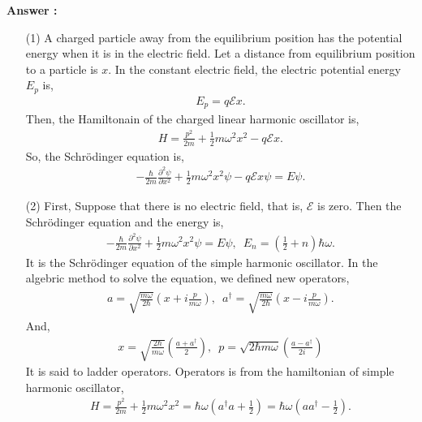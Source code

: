 \documentclass[floatfix,nofootinbib,superscriptaddress,fleqn]{revtex4-2}
\begin{document}
\noindent \textbf{Answer : }
\begin{itemize}
  \item[(1)] A charged particle away from the equilibrium position 
  has the potential energy when it is in the electric field. 
  Let a distance from equilibrium position to a particle is $x$.
  In the constant electric field, the electric potential energy $E_p$ is,
  \begin{align}
    E_p = q\mathcal{E}x.
  \end{align} 
  Then, the Hamiltonain of the charged linear
  harmonic oscillator is,
  \begin{align}\label{eq:1-1}
    H = \frac{p^2}{2m}+\frac{1}{2}m\omega^2x^2-q\mathcal{E}x.
  \end{align}
  So, the Schr\"odinger equation is,
  \begin{align}\label{eq:1-2}
    -\frac{\hbar}{2m}\frac{\partial^2\psi}{\partial x^2}
    +\frac{1}{2}m\omega^2x^2\psi
    -q\mathcal{E}x\psi = E\psi.
  \end{align}
  \item[(2)] First, Suppose that there is no electric field,
  that is, $\mathcal{E}$ is zero. Then the Schr\"odinger equation and 
  the energy is,
  \begin{align}
    -\frac{\hbar}{2m}\frac{\partial^2\psi}{\partial x^2}
    +\frac{1}{2}m\omega^2x^2\psi = E\psi,\,\,\, 
    E_n = \left(\frac{1}{2}+n\right)\hbar\omega.
  \end{align}
  It is the Schr\"odinger equation of the simple harmonic oscillator. 
  In the algebric method to solve the equation, 
  we defined new operators,
  \begin{align}
    \begin{split}
      a = \sqrt{\frac{m\omega}{2\hbar}}\left(x+i\frac{p}{m\omega}\right),\,\,\,
      a^\dagger = \sqrt{\frac{m\omega}{2\hbar}}\left(x-i\frac{p}{m\omega}\right). 
    \end{split}
  \end{align}
  And,
  \begin{align}
    x = \sqrt{\frac{2\hbar}{m\omega}}\left(\frac{a+a^\dagger}{2}\right),\,\,\,
    p = \sqrt{2\hbar m\omega}\left(\frac{a-a^\dagger}{2i}\right)
  \end{align}
  It is said to ladder operators. Operators is from the hamiltonian of 
  simple harmonic oscillator,
  \begin{align}\label{eq:1-3}
    H = \frac{p^2}{2m}+\frac{1}{2}m\omega^2x^2 
    = \hbar\omega\left(a^\dagger a + \frac{1}{2}\right)
    = \hbar\omega\left(a a^\dagger - \frac{1}{2}\right).

\end{align}
\end{itemize}
\end{document}
